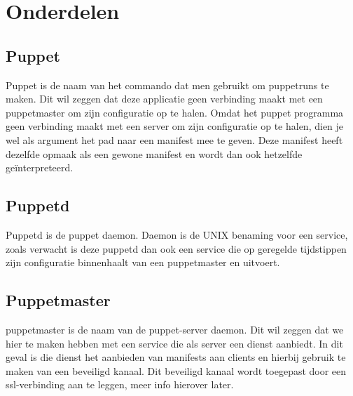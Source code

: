 \section{Onderdelen}

\subsection{Puppet}
Puppet is de naam van het commando dat men gebruikt om puppetruns te maken. Dit wil zeggen dat deze applicatie geen verbinding maakt met een puppetmaster om zijn configuratie op te halen. Omdat het puppet programma geen verbinding maakt met een server om zijn configuratie op te halen, dien je wel als argument het pad naar een manifest mee te geven. Deze manifest heeft dezelfde opmaak als een gewone manifest en wordt dan ook hetzelfde ge\"interpreteerd.

\subsection{Puppetd}
Puppetd is de puppet daemon. Daemon is de UNIX benaming voor een service, zoals verwacht is deze puppetd dan ook een service die op geregelde tijdstippen zijn configuratie binnenhaalt van een puppetmaster en uitvoert.

\subsection{Puppetmaster}
puppetmaster is de naam van de puppet-server daemon. Dit wil zeggen dat we hier te maken hebben met een service die als server een dienst aanbiedt. In dit geval is die dienst het aanbieden van manifests aan clients en hierbij gebruik te maken van een beveiligd kanaal. Dit beveiligd kanaal wordt toegepast door een ssl-verbinding aan te leggen, meer info hierover later.

